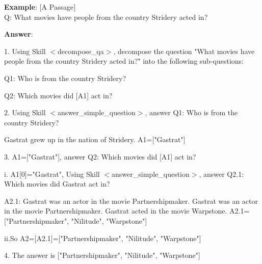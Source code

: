 \documentclass{article} %
\begin{document}
\noindent\begin{minipage}{\textwidth} 
 \label{Tab:qa_skill}
\end{minipage}

\newpage


\begin{tcolorbox}[title = {An Example of Skill Composition for the CommaQA-E Task}, colback = Apricot!25!white, colframe = BrickRed!75!black] 
\textbf{Example}: $[$A Passage$]$ \\ 
Q: What movies have people from the country Stridery acted in? 

\quad

\textbf{Answer}:

1. Using Skill $<$decompose\_qa$>$, decompose the question "What movies have people from the country Stridery acted in?" into the following sub-questions:  

\quad

\qquad Q1: Who is from the country Stridery? 

\qquad Q2: Which movies did [A1] act in? 

\quad

2. Using Skill $<$answer\_simple\_question$>$, answer Q1: Who is from the country Stridery? 

\quad 

\qquad  Gastrat grew up in the nation of Stridery. A1=["Gastrat"] 

\quad 

3. A1=["Gastrat"], answer Q2: Which movies did [A1] act in? 

\quad

 \qquad   i. A1[0]="Gastrat", Using Skill $<$answer\_simple\_question$>$, answer Q2.1: Which movies did Gastrat act in?  

  \qquad \quad A2.1: Gastrat was an actor in the movie Partnershipmaker. Gastrat was an actor in the movie Partnershipmaker. Gastrat acted in the movie Warpstone.  A2.1=["Partnershipmaker", "Nilitude", "Warpstone"] 

\quad
  
  \qquad  ii.So A2=[A2.1]=["Partnershipmaker", "Nilitude", "Warpstone"] 

\quad
  
4. The answer is ["Partnershipmaker", "Nilitude", "Warpstone"]
\end{tcolorbox}
\noindent\begin{minipage}{\textwidth}    
 \label{Tab:compose_qa_skill}
\end{minipage}
\end{document}
